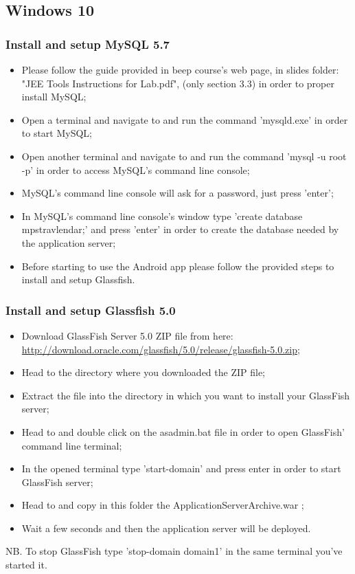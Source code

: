 \subsection{Windows 10}
\label{subsect:Windows 10}

\subsubsection{Install and setup MySQL 5.7}
\begin{itemize}
	\item Please follow the guide provided in beep course's web page, in slides folder: "JEE Tools Instructions for Lab.pdf", (only section 3.3) in order to proper install MySQL;
	\item Open a terminal and navigate to  and run the command 'mysqld.exe' in order to start MySQL;
	\item Open another terminal and navigate to  and run the command 'mysql -u root -p' in order to access MySQL's command line console;
	\item MySQL's command line console will ask for a password, just press 'enter';
	\item In MySQL's command line console's window type 'create database mps\textunderscore travlendar;' and press 'enter' in order to create the database needed by the application server;
	\item Before starting to use the Android app please follow the provided steps to install and setup Glassfish.
\end{itemize}

\subsubsection{Install and setup Glassfish 5.0}
\begin{itemize}
	\item Download GlassFish Server 5.0 ZIP file from here: \\ \href{http://download.oracle.com/glassfish/5.0/release/glassfish-5.0.zip}{\color{blue}http://download.oracle.com/glassfish/5.0/release/glassfish-5.0.zip};
	\item Head to the directory where you downloaded the ZIP file;
	\item Extract the file into the directory in which you want to install your GlassFish server;
	\item Head to  and double click on the asadmin.bat file in order to open GlassFish' command line terminal;
	\item In the opened terminal type 'start-domain' and press enter in order to start GlassFish server;
	\item Head to  and copy in this folder the ApplicationServerArchive.war ;
	\item Wait a few seconds and then the application server will be deployed.
\end{itemize} 
NB. To stop GlassFish type 'stop-domain domain1' in the same terminal you've started it.
	
